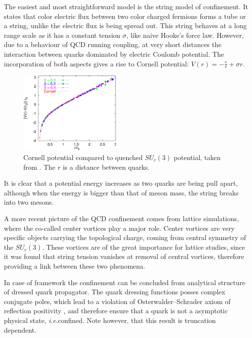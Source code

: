 The easiest and most straightforward model is the string model of confinement. It states that color electric flux between two color charged fermions forms a tube or a string, unlike the electric flux is being spread out. This string behaves at a long range scale as it has a constant tension $\sigma$, like naive Hooke's force law. However, due to a behaviour of QCD running coupling, at very short distances the interaction between quarks dominated by electric Coulomb potential. The incorporation of both aspects gives a rise to Cornell potential: $V(r) = - \frac{e}{r} + \sigma r$.
\begin{figure}[t]
\tiny
 \begin{center}
  \includegraphics[width=0.45\textwidth]{figures/cornell_V.png}
 \end{center}
 \caption{\footnotesize Cornell potential compared to quenched $SU_c(3)$ potential, taken from \cite{Bali:2000gf}. The $r$ is a distance between quarks.}\label{fig:cornell_V} 
\end{figure}
It is clear that a potential energy increases as two quarks are being pull apart, although when the energy is bigger than that of meson mass, the string breaks into two mesons.

A more recent picture of the QCD confinement comes from lattice simulations, where the co-called center vortices play a major role. Center vortices are very specific objects carrying the topological charge, coming from central symmetry of the $SU_c(3)$. These vortices are of the great importance for lattice studies, since it was found that string tension vanishes at removal of central vortices, therefore providing a link between these two phenomena.

In case of \DS framework the confinement can be concluded from analytical structure of dressed quark propagator. The quark dressing functions posses complex conjugate poles, which lead to a violation of Osterwalder--Schrader axiom of reflection positivity \cite{Osterwalder:1973dx}, and therefore ensure that a quark is not a asymptotic physical state, \textit{i.e.}confined. Note however, that this result is truncation dependent.

